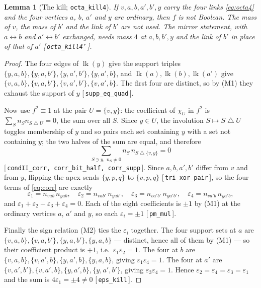 \documentclass[11pt,reqno]{amsart}
\newcommand{\leanref}[1]{\textup{[\,\texttt{#1}\,]}}
\theoremstyle{plain}
\newtheorem{lemma}[theorem]{Lemma}
\theoremstyle{definition}
\numberwithin{theorem}{section}
\newcommand{\sd}{\mathbin{\triangle}}
\newcommand{\lk}{\operatorname{lk}}
\newcommand{\eps}{\varepsilon}
\begin{document}
\begin{lemma}[The kill; \texttt{octa\_kill4}]\label{lem:octakill}
If $v, a, b, a', b', y$ carry the four links \eqref{eq:octa4} and the four vertices $a$, $b$,
$a'$ and $y$ are ordinary, then $f$ is not Boolean. The mass of $v$, the mass of $b'$ and the
link of $b'$ are not used. The mirror statement, with $a \leftrightarrow b$ and
$a' \leftrightarrow b'$ exchanged, needs mass $4$ at $a, b, b', y$ and the link of $b'$ in place
of that of $a'$ \leanref{octa\_kill4'}.
\end{lemma}

\begin{proof}
The four edges of $\lk(y)$ give the support triples
$\{y,a,b\}, \{y,a,b'\}, \{y,a',b'\}, \{y,a',b\}$, and $\lk(a), \lk(b), \lk(a')$ give
$\{v,a,b\}, \{v,a,b'\}, \{v,a',b'\}, \{v,a',b\}$. The first four are distinct, so by (M1) they
exhaust the support of $y$ \leanref{supp\_eq\_quad}.

Now use $f^2 \equiv 1$ at the pair $U = \{v,y\}$: the coefficient of $\chi_U$ in $f^2$ is
$\sum_{S} n_S n_{S \sd U} = 0$, the sum over all $S$. Since $y \in U$, the involution
$S \mapsto S \sd U$ toggles membership of $y$ and so pairs each set containing $y$ with a set
not containing $y$; the two halves of the sum are equal, and therefore
\begin{equation}\label{eq:corr}
  \sum_{S \ni y,\; n_S \ne 0} n_S\, n_{S \sd \{v,y\}} = 0
\end{equation}
\leanref{condII\_corr, corr\_bit\_half, corr\_supp}. Since $a, b, a', b'$ differ from $v$ and
from $y$, flipping the apex sends $\{y,p,q\}$ to $\{v,p,q\}$ \leanref{tri\_xor\_pair}, so the
four terms of \eqref{eq:corr} are exactly
\[
  \eps_1 = n_{vab}\,n_{yab}, \quad \eps_2 = n_{vab'}\,n_{yab'}, \quad
  \eps_3 = n_{va'b'}\,n_{ya'b'}, \quad \eps_4 = n_{va'b}\,n_{ya'b},
\]
and $\eps_1 + \eps_2 + \eps_3 + \eps_4 = 0$. Each of the eight coefficients is $\pm1$ by (M1) at
the ordinary vertices $a$, $a'$ and $y$, so each $\eps_i = \pm1$ \leanref{pm\_mul}.

Finally the sign relation (M2) ties the $\eps_i$ together. The four support sets at $a$ are
$\{v,a,b\}, \{v,a,b'\}, \{y,a,b'\}, \{y,a,b\}$ --- distinct, hence all of them by (M1) --- so
their coefficient product is $+1$, i.e.\ $\eps_1\eps_2 = 1$. The four at $b$ are
$\{v,a,b\}, \{v,a',b\}, \{y,a',b\}, \{y,a,b\}$, giving $\eps_1\eps_4 = 1$. The four at $a'$ are
$\{v,a',b'\}, \{v,a',b\}, \{y,a',b\}, \{y,a',b'\}$, giving $\eps_3\eps_4 = 1$. Hence
$\eps_2 = \eps_4 = \eps_3 = \eps_1$ and the sum is $4\eps_1 = \pm4 \ne 0$
\leanref{eps\_kill}.
\end{proof}
\end{document}
